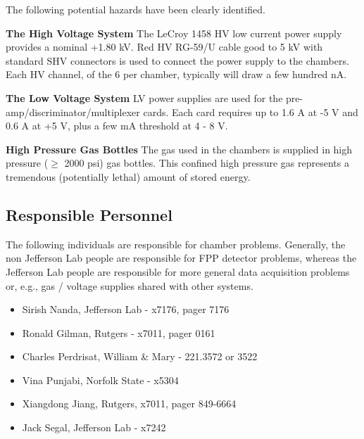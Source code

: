 \begin{safetyen}{50}{50}
The following potential hazards have been clearly identified.

\begin{description}

\item {\bf The High Voltage System}
The LeCroy 1458 HV low current power supply provides a nominal
+1.80 kV.
Red HV RG-59/U cable good to 5 kV with standard SHV connectors is used
to connect the power supply to the chambers.
Each HV channel, of the 6 per chamber, typically will draw a few hundred nA.

\item {\bf The Low Voltage System}
LV power supplies are used for the pre-amp/discriminator/multiplexer
cards.
Each card requires up to 
1.6 A at -5 V and 0.6 A at +5 V, plus a few mA threshold at 4 - 8 V.

\item{\bf High Pressure Gas Bottles} The  gas used 
in the chambers is supplied in high pressure ($\ge$ 2000 psi) gas
bottles. This confined high pressure gas represents a tremendous
(potentially lethal) amount of stored energy.
\end{description}
\end{safetyen}

\subsection{Responsible Personnel} 
The following individuals are responsible for chamber problems. 
Generally, the non Jefferson Lab people are responsible for
FPP detector problems, whereas the Jefferson Lab people are responsible
for more general data acquisition problems or, e.g., gas / voltage supplies
shared with other systems.
\begin{itemize}
\item[~]Sirish Nanda, Jefferson Lab - x7176, pager 7176
\item[~]Ronald Gilman, Rutgers - x7011, pager 0161
\item[~]Charles Perdrisat, William \& Mary  - 221.3572 or 3522
\item[~]Vina Punjabi, Norfolk State  - x5304
\item[~]Xiangdong Jiang, Rutgers, x7011, pager 849-6664
\item[~]Jack Segal, Jefferson Lab - x7242
\end{itemize}
 
\vfill\eject
%
%
%
%

